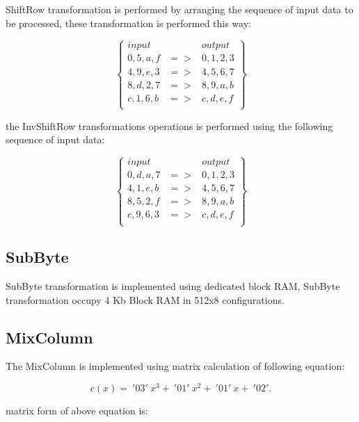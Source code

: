 \documentclass[a4paper,12pt]{report}
\begin{document}
ShiftRow transformation is performed by arranging the sequence of input
data to be processed, these transformation is performed this way:

\begin{displaymath}
\left\{
\begin{array}{lcl}
input    &    & output \\
0,5,a,f  & => & 0,1,2,3\\
4,9,e,3  & => & 4,5,6,7\\
8,d,2,7  & => & 8,9,a,b\\
c,1,6,b  & => & c,d,e,f\\
\end{array}
\right\}
\end{displaymath}

the InvShiftRow transformations operations is performed using the
following sequence of input data:

\begin{displaymath}
\left\{
\begin{array}{lcl}
input    &    & output \\
0,d,a,7  & => & 0,1,2,3\\
4,1,e,b  & => & 4,5,6,7\\
8,5,2,f  & => & 8,9,a,b\\
c,9,6,3  & => & c,d,e,f\\
\end{array}
\right\}
\end{displaymath}

\subsection{SubByte}

SubByte transformation is implemented using dedicated block RAM, SubByte
transformation occupy 4 Kb Block RAM in 512x8 configurations.

\subsection{MixColumn}

The MixColumn is implemented using matrix calculation of following equation:

\begin{equation}
c(x) =~'03'~x^3 +~'01'~x^2 +~'01'~x +~'02'.
\end{equation}

matrix form of above equation is:
\end{document}
